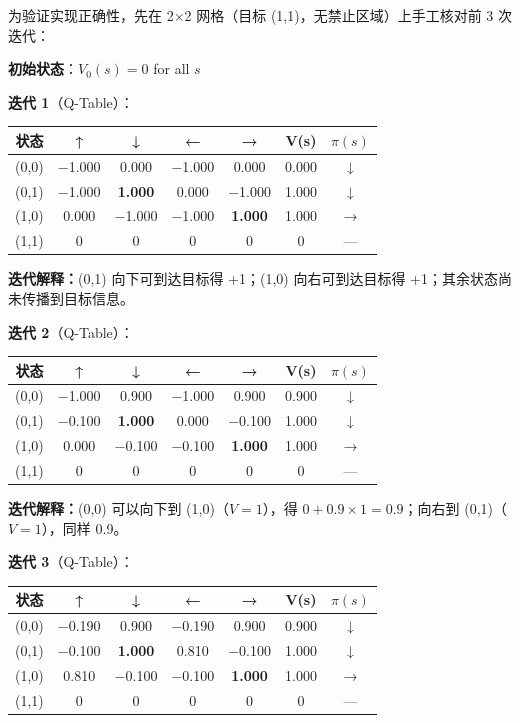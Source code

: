 \documentclass[11pt,a4paper,UTF8]{ctexart}
\numberwithin{figure}{section}
\numberwithin{table}{section}
\newcommand{\goalstar}{\ding{72}}
\begin{document}
为验证实现正确性，先在 2×2 网格（目标 (1,1)，无禁止区域）上手工核对前 3 次迭代：

\textbf{初始状态}：$V_0(s) = 0$ for all $s$

\textbf{迭代 1}（Q-Table）：

\begin{table}[H]
\centering
\begin{tabular}{ccccccc}
\toprule
状态 & ↑ & ↓ & ← & → & V(s) & $\pi(s)$ \\
\midrule
(0,0) & −1.000 & 0.000 & −1.000 & 0.000 & 0.000 & ↓ \\
(0,1) & −1.000 & \textbf{1.000} & 0.000 & −1.000 & 1.000 & ↓ \\
(1,0) & 0.000 & −1.000 & −1.000 & \textbf{1.000} & 1.000 & → \\
(1,1) \goalstar & 0 & 0 & 0 & 0 & 0 & — \\
\bottomrule
\end{tabular}
\end{table}

\textbf{迭代解释：}(0,1) 向下可到达目标得 +1；(1,0) 向右可到达目标得 +1；其余状态尚未传播到目标信息。

\textbf{迭代 2}（Q-Table）：

\begin{table}[H]
\centering
\begin{tabular}{ccccccc}
\toprule
状态 & ↑ & ↓ & ← & → & V(s) & $\pi(s)$ \\
\midrule
(0,0) & −1.000 & 0.900 & −1.000 & 0.900 & 0.900 & ↓ \\
(0,1) & −0.100 & \textbf{1.000} & 0.000 & −0.100 & 1.000 & ↓ \\
(1,0) & 0.000 & −0.100 & −0.100 & \textbf{1.000} & 1.000 & → \\
(1,1) \goalstar & 0 & 0 & 0 & 0 & 0 & — \\
\bottomrule
\end{tabular}
\end{table}

\textbf{迭代解释：}(0,0) 可以向下到 (1,0)（$V=1$），得 $0 + 0.9 \times 1 = 0.9$；向右到 (0,1)（$V=1$），同样 0.9。

\textbf{迭代 3}（Q-Table）：

\begin{table}[H]
\centering
\begin{tabular}{ccccccc}
\toprule
状态 & ↑ & ↓ & ← & → & V(s) & $\pi(s)$ \\
\midrule
(0,0) & −0.190 & 0.900 & −0.190 & 0.900 & 0.900 & ↓ \\
(0,1) & −0.100 & \textbf{1.000} & 0.810 & −0.100 & 1.000 & ↓ \\
(1,0) & 0.810 & −0.100 & −0.100 & \textbf{1.000} & 1.000 & → \\
(1,1) \goalstar & 0 & 0 & 0 & 0 & 0 & — \\
\bottomrule
\end{tabular}
\end{table}
\end{document}
